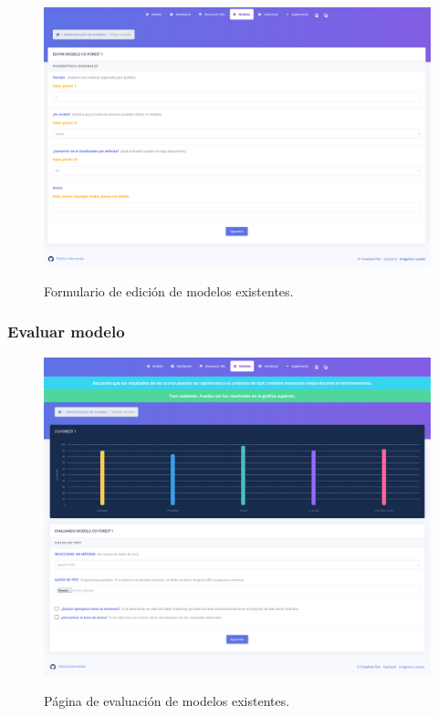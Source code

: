 \begin{figure}[h]
	\caption[Manual de usuario: editar modelo]{Formulario de edición de modelos existentes.}
	\centering
	\includegraphics[scale=0.18]{../img/anexos/user_guide/5_edit_model}
	\label{e-5:edit-model}
\end{figure}


\subsubsection{Evaluar modelo}

\begin{figure}[h]
	\caption[Manual de usuario: evaluar modelo]{Página de evaluación de modelos existentes.}
	\centering
	\includegraphics[scale=0.18]{../img/anexos/user_guide/5_test_model}
	\label{e-5:test-model}
\end{figure}


